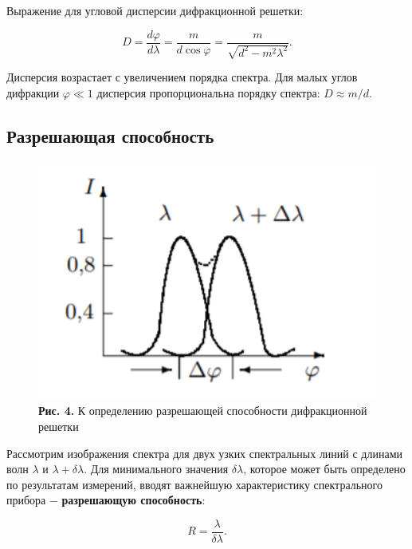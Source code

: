 \documentclass[a4paper,12pt]{article} %
\begin{document}
\hfill \break Выражение для угловой дисперсии дифракционной решетки:

\begin{equation}\label{ linkname }
D = \frac{d \varphi}{d \lambda} = \frac{m}{d \cos{\varphi}} = \frac{m}{\sqrt{d^2 - m^2\lambda^2}}.
\end{equation}

\hfill \break Дисперсия возрастает с увеличением порядка спектра. Для малых углов дифракции $\varphi \ll 1$  дисперсия пропорциональна порядку спектра: $D \approx m/d$.

\subsection{Разрешающая способность}

\begin{figure}
\begin{center}
    \includegraphics[width=1\textwidth]{4.4.1_3.png}
    \textbf{Рис. 4.} К определению разрешающей способности дифракционной решетки 
\end{center}
\end{figure} 

\hfill \break Рассмотрим изображения спектра для двух узких спектральных линий с длинами волн $\lambda$ и $\lambda + \delta \lambda$. Для минимального значения $\delta \lambda$, которое может быть определено по результатам измерений, вводят важнейшую характеристику спектрального прибора $-$ \textbf{разрешающую способность}:

\begin{equation}\label{ linkname }
R = \frac{\lambda}{\delta \lambda}.
\end{equation}
\end{document}
